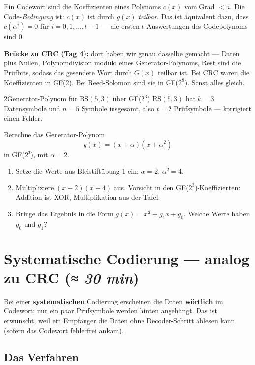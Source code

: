 Ein Codewort sind die Koeffizienten eines Polynoms $c(x)$ vom Grad
$< n$. Die Code-\emph{Bedingung} ist: $c(x)$ ist durch $g(x)$
\emph{teilbar}. Das ist äquivalent dazu, dass $c(\alpha^i) = 0$ für
$i = 0, 1, \dots, t-1$ — die ersten $t$ Auswertungen des Codepolynoms
sind 0.

\textbf{Brücke zu CRC (Tag 4):} dort haben wir genau dasselbe gemacht
— Daten plus Nullen, Polynomdivision modulo eines Generator-Polynoms,
Rest sind die Prüfbits, sodass das gesendete Wort durch $G(x)$
teilbar ist. Bei CRC waren die Koeffizienten in GF(2). Bei
Reed-Solomon sind sie in GF($2^8$). Sonst alles gleich.

\begin{bleistiftuebung}{2}{Generator-Polynom für RS$(5,3)$ über GF($2^3$)}
RS$(5,3)$ hat $k=3$ Datensymbole und $n=5$ Symbole insgesamt, also
$t = 2$ Prüfsymbole — korrigiert einen Fehler.

Berechne das Generator-Polynom
\[
  g(x) = (x + \alpha)(x + \alpha^2)
\]
in GF($2^3$), mit $\alpha = 2$.

\begin{enumerate}[label=(\alph*), leftmargin=*]
\item Setze die Werte aus Bleistiftübung 1 ein: $\alpha = 2$, $\alpha^2 = 4$.
\item Multipliziere $(x + 2)(x + 4)$ aus. Vorsicht in den
  GF($2^3$)-Koeffizienten: Addition ist XOR, Multiplikation aus der
  Tafel.
\item Bringe das Ergebnis in die Form $g(x) = x^2 + g_1 x + g_0$.
  Welche Werte haben $g_0$ und $g_1$?
\end{enumerate}
\end{bleistiftuebung}

\section{Systematische Codierung — analog zu CRC \normalfont(\textit{≈ 30 min})}

Bei einer \textbf{systematischen} Codierung erscheinen die Daten
\textbf{wörtlich} im Codewort; nur ein paar Prüfsymbole werden hinten
angehängt. Das ist erwünscht, weil ein Empfänger die Daten ohne
Decoder-Schritt ablesen kann (sofern das Codewort fehlerfrei
ankam).

\subsection*{Das Verfahren}

